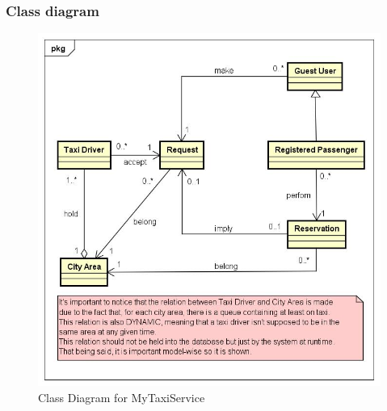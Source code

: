 \subsubsection{Class diagram}
\begin{figure}[h!]
	\centering
	\graphicspath{ {../SE2_IMAGES/} }
	\includegraphics[width=\linewidth]{ClassDiagramFinal}
	\caption{Class Diagram for MyTaxiService}
\end{figure}
\newpage
